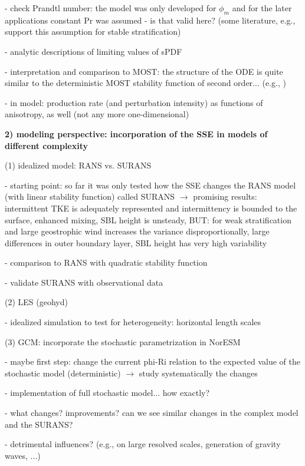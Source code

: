 \documentclass[11pt]{article}
\begin{document}
\begin{compactenum}
		\item[-] check Prandtl number: the model was only developed for $\phi_m$ and for the later applications constant Pr was assumed - is that valid here? (some literature, e.g., \citet{Li2012} support this assumption for stable stratification)
		\item[-] analytic descriptions of limiting values of sPDF \citep{BoykoDiss2022}
		\item[-] interpretation and comparison to MOST: the structure of the ODE is quite similar to the deterministic MOST stability function of second order... (e.g., \citet{Businger1971})
		\item[-] in \citet{BoykoPaper2022} model: production rate (and perturbation intensity) as functions of anisotropy, as well (not any more one-dimensional)		
		\\[0.3cm]
	\end{compactenum}


	\textbf{2) modeling perspective: incorporation of the SSE in models of different complexity}
	\begin{compactenum}
		\item[(1)] idealized model: RANS vs. SURANS
		\begin{compactenum}
			\item[-] starting point: so far it was only tested how the SSE changes the RANS model (with linear stability function) called SURANS $\rightarrow$ promising results: intermittent TKE is adequately represented and intermittency is bounded to the surface, enhanced mixing, SBL height is unsteady, BUT: for weak stratification and large geostrophic wind increases the variance disproportionally, large differences in outer boundary layer, SBL height has very high variability 
			\item[-] comparison to RANS with quadratic stability function
			\item[-] validate SURANS with observational data
		\end{compactenum}
		\item[(2)] LES (geohyd)
		\begin{compactenum}
			\item[-] idealized simulation to test for heterogeneity: horizontal length scales
		\end{compactenum}
		\item[(3)] GCM: incorporate the stochastic parametrization in NorESM
		\begin{compactenum}
			\item[-] maybe first step: change the current phi-Ri relation to the expected value of the stochastic model (deterministic) $\rightarrow$ study systematically the changes
			\item[-] implementation of full stochastic model... how exactly?
			\item[-] what changes? improvements? can we see similar changes in the complex model and the SURANS? 
			\item[-] detrimental influences? (e.g., on large resolved scales, generation of gravity waves, ...) \\[0.3cm]
		\end{compactenum}
	\end{compactenum}
	
\end{document}
